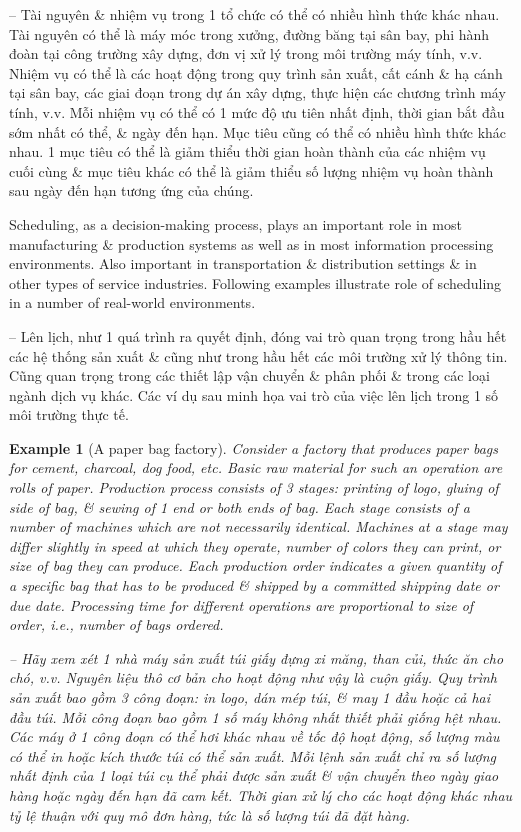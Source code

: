 \documentclass{article}
\newtheorem{example}{Example}
\begin{document}
\begin{itemize}
\begin{itemize}
        -- Tài nguyên \& nhiệm vụ trong 1 tổ chức có thể có nhiều hình thức khác nhau. Tài nguyên có thể là máy móc trong xưởng, đường băng tại sân bay, phi hành đoàn tại công trường xây dựng, đơn vị xử lý trong môi trường máy tính, v.v. Nhiệm vụ có thể là các hoạt động trong quy trình sản xuất, cất cánh \& hạ cánh tại sân bay, các giai đoạn trong dự án xây dựng, thực hiện các chương trình máy tính, v.v. Mỗi nhiệm vụ có thể có 1 mức độ ưu tiên nhất định, thời gian bắt đầu sớm nhất có thể, \& ngày đến hạn. Mục tiêu cũng có thể có nhiều hình thức khác nhau. 1 mục tiêu có thể là giảm thiểu thời gian hoàn thành của các nhiệm vụ cuối cùng \& mục tiêu khác có thể là giảm thiểu số lượng nhiệm vụ hoàn thành sau ngày đến hạn tương ứng của chúng.

        Scheduling, as a decision-making process, plays an important role in most manufacturing \& production systems as well as in most information processing environments. Also important in transportation \& distribution settings \& in other types of service industries. Following examples illustrate role of scheduling in a number of real-world environments.

        -- Lên lịch, như 1 quá trình ra quyết định, đóng vai trò quan trọng trong hầu hết các hệ thống sản xuất \& cũng như trong hầu hết các môi trường xử lý thông tin. Cũng quan trọng trong các thiết lập vận chuyển \& phân phối \& trong các loại ngành dịch vụ khác. Các ví dụ sau minh họa vai trò của việc lên lịch trong 1 số môi trường thực tế.

        \begin{example}[A paper bag factory]
            Consider a factory that produces paper bags for cement, charcoal, dog food, etc. Basic raw material for such an operation are rolls of paper. Production process consists of 3 stages: printing of logo, gluing of side of bag, \& sewing of 1 end or both ends of bag. Each stage consists of a number of machines which are not necessarily identical. Machines at a stage may differ slightly in speed at which they operate, number of colors they can print, or size of bag they can produce. Each production order indicates a given quantity of a specific bag that has to be produced \& shipped by a committed shipping date or due date. Processing time for different operations are proportional to size of order, i.e., number of bags ordered.

            -- Hãy xem xét 1 nhà máy sản xuất túi giấy đựng xi măng, than củi, thức ăn cho chó, v.v. Nguyên liệu thô cơ bản cho hoạt động như vậy là cuộn giấy. Quy trình sản xuất bao gồm 3 công đoạn: in logo, dán mép túi, \& may 1 đầu hoặc cả hai đầu túi. Mỗi công đoạn bao gồm 1 số máy không nhất thiết phải giống hệt nhau. Các máy ở 1 công đoạn có thể hơi khác nhau về tốc độ hoạt động, số lượng màu có thể in hoặc kích thước túi có thể sản xuất. Mỗi lệnh sản xuất chỉ ra số lượng nhất định của 1 loại túi cụ thể phải được sản xuất \& vận chuyển theo ngày giao hàng hoặc ngày đến hạn đã cam kết. Thời gian xử lý cho các hoạt động khác nhau tỷ lệ thuận với quy mô đơn hàng, tức là số lượng túi đã đặt hàng.


\end{example}
\end{itemize}
\end{itemize}
\end{document}
